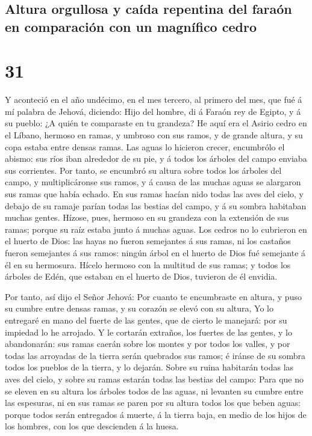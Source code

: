 \hypertarget{altura-orgullosa-y-cauxedda-repentina-del-farauxf3n-en-comparaciuxf3n-con-un-magnuxedfico-cedro}{%
\subsection{Altura orgullosa y caída repentina del faraón en comparación
con un magnífico
cedro}\label{altura-orgullosa-y-cauxedda-repentina-del-farauxf3n-en-comparaciuxf3n-con-un-magnuxedfico-cedro}}

\hypertarget{section-30}{%
\section{31}\label{section-30}}

 Y aconteció en el año undécimo, en el mes tercero, al
primero del mes, que fué á mí palabra de Jehová, diciendo: 
Hijo del hombre, di á Faraón rey de Egipto, y á su pueblo: ¿A quién te
comparaste en tu grandeza?  He aquí era el Asirio cedro en
el Líbano, hermoso en ramas, y umbroso con sus ramos, y de grande
altura, y su copa estaba entre densas ramas.  Las aguas lo
hicieron crecer, encumbrólo el abismo: sus ríos iban alrededor de su
pie, y á todos los árboles del campo enviaba sus corrientes.
 Por tanto, se encumbró su altura sobre todos los árboles
del campo, y multiplicáronse sus ramos, y á causa de las muchas aguas se
alargaron sus ramas que había echado.  En sus ramas hacían
nido todas las aves del cielo, y debajo de su ramaje parían todas las
bestias del campo, y á su sombra habitaban muchas gentes. 
Hízose, pues, hermoso en su grandeza con la extensión de sus ramas;
porque su raíz estaba junto á muchas aguas.  Los cedros no
lo cubrieron en el huerto de Dios: las hayas no fueron semejantes á sus
ramas, ni los castaños fueron semejantes á sus ramos: ningún árbol en el
huerto de Dios fué semejante á él en su hermosura.  Hícelo
hermoso con la multitud de sus ramas; y todos los árboles de Edén, que
estaban en el huerto de Dios, tuvieron de él envidia.

 Por tanto, así dijo el Señor Jehová: Por cuanto te
encumbraste en altura, y puso su cumbre entre densas ramas, y su corazón
se elevó con su altura,  Yo lo entregaré en mano del fuerte
de las gentes, que de cierto le manejará: por su impiedad lo he
arrojado.  Y le cortarán extraños, los fuertes de las
gentes, y lo abandonarán: sus ramas caerán sobre los montes y por todos
los valles, y por todas las arroyadas de la tierra serán quebrados sus
ramos; é iránse de su sombra todos los pueblos de la tierra, y lo
dejarán.  Sobre su ruina habitarán todas las aves del
cielo, y sobre su ramas estarán todas las bestias del campo:
 Para que no se eleven en su altura los árboles todos de
las aguas, ni levanten su cumbre entre las espesuras, ni en sus ramas se
paren por su altura todos los que beben aguas: porque todos serán
entregados á muerte, á la tierra baja, en medio de los hijos de los
hombres, con los que descienden á la huesa.

